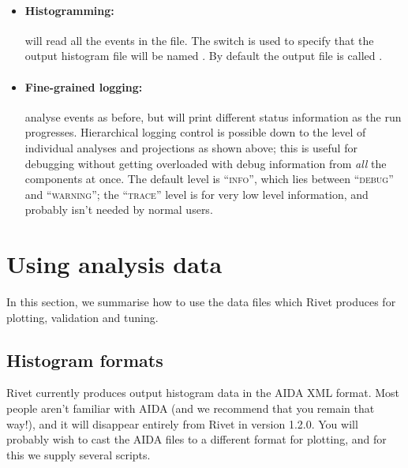 \documentclass{JHEP3}
\begin{document}
\begin{itemize}
\item \paragraph{Histogramming:}{ will read all the
    events in the  file. The  switch is used to specify
    that the output histogram file will be named . By default the
    output file is called .}

\item \paragraph{Fine-grained logging:}{ analyse events as before, but will print different status
    information as the run progresses. Hierarchical logging control is possible
    down to the level of individual analyses and projections as shown above;
    this is useful for debugging without getting overloaded with debug
    information from \emph{all} the components at once. The default level is
    ``\textsc{info}'', which lies between ``\textsc{debug}'' and
    ``\textsc{warning}''; the ``\textsc{trace}'' level is for very low level
    information, and probably isn't needed by normal users.}

\end{itemize}



\section{Using analysis data}

In this section, we summarise how to use the data files which Rivet produces for
plotting, validation and tuning.

\subsection{Histogram formats}

Rivet currently produces output histogram data in the AIDA XML format. Most
people aren't familiar with AIDA (and we recommend that you remain that way!),
and it will disappear entirely from Rivet in version 1.2.0. You will probably
wish to cast the AIDA files to a different format for plotting, and for this we
supply several scripts.
\end{document}
